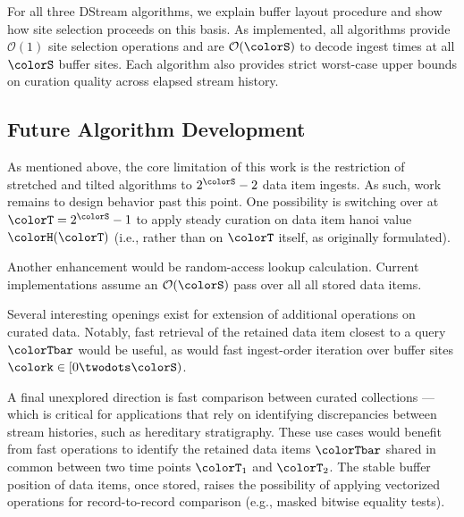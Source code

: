 For all three DStream algorithms, we explain buffer layout procedure and show how site selection proceeds on this basis.
As implemented, all algorithms provide $\mathcal{O}(1)$ site selection operations and are $\mathcal{O}(\colorS)$ to decode ingest times at all $\colorS$ buffer sites.
Each algorithm also provides strict worst-case upper bounds on curation quality across elapsed stream history.

\subsection{Future Algorithm Development}

As mentioned above, the core limitation of this work is the restriction of stretched and tilted algorithms to $2^{\colorS} - 2$ data item ingests.
As such, work remains to design behavior past this point.
One possibility is switching over at $\colorT = 2^{\colorS} - 1$ to apply steady curation on data item hanoi value $\colorH(\colorT)$ (i.e., rather than on $\colorT$ itself, as originally formulated).

Another enhancement would be random-access lookup calculation.
Current implementations assume an $\mathcal{O}(\colorS)$ pass over all all stored data items.

Several interesting openings exist for extension of additional operations on curated data.
Notably, fast retrieval of the retained data item closest to a query $\colorTbar$ would be useful, as would fast ingest-order iteration over buffer sites $\colork \in [0 \twodots \colorS)$.

A final unexplored direction is fast comparison between curated collections --- which is critical for applications that rely on identifying discrepancies between stream histories, such as hereditary stratigraphy.
These use cases would benefit from fast operations to identify the retained data items $\colorTbar$ shared in common between two time points $\colorT_1$ and $\colorT_2$.
The stable buffer position of data items, once stored, raises the possibility of applying vectorized operations for record-to-record comparison (e.g., masked bitwise equality tests).


